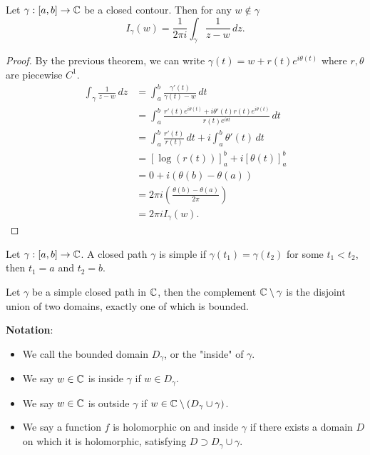 \documentclass[10pt, a4paper]{article}
\begin{document}
\begin{lemma}
    Let $\gamma : [a, b] \to \mathbb{C}$ be a closed contour.
    Then for any $w \notin \gamma$
    \[
    I_{\gamma}(w) = \frac{1}{2\pi i}\int_{\gamma}\frac{1}{z - w}\,dz.
    \]

    \begin{proof}
        By the previous theorem,
        we can write $\gamma(t) = w + r(t)e ^ {i\theta(t)}$ where $r, \theta$ are piecewise $C ^ 1$.
        \begin{align*}
            \int_{\gamma}\frac{1}{z - w}\,dz &= \int_{a}^{b}\frac{\gamma'(t)}{\gamma(t) - w}\,dt \\
            &= \int_{a}^{b}\frac{r'(t)e ^ {i\theta(t)} + i\theta'(t)r(t)e ^ {i\theta(t)}}{r(t)e ^ {i\theta t}}\,dt \\
            &= \int_{a}^{b}\frac{r'(t)}{r(t)}\,dt + i\int_{a}^{b}\theta'(t)\,dt \\
            &= \left[\log(r(t))\right]_{a}^{b} + i\left[\theta(t)\right]_{a}^{b} \\
            &= 0 + i(\theta(b) - \theta(a)) \\
            &= 2\pi i\left(\frac{\theta(b) - \theta(a)}{2\pi}\right) \\
            &= 2\pi iI_{\gamma}(w).
        \end{align*}
    \end{proof}
\end{lemma}

\begin{definition}
    Let $\gamma : [a, b] \to \mathbb{C}$.
    A closed path $\gamma$ is simple if $\gamma(t_1) = \gamma(t_2)$ for some $t_1 < t_2$,
    then $t_1 = a$ and $t_2 = b$.
\end{definition}

\begin{theorem}
    Let $\gamma$ be a simple closed path in $\mathbb{C}$,
    then the complement $\mathbb{C} \setminus \gamma$ is the disjoint union of two domains,
    exactly one of which is bounded.
\end{theorem}

\textbf{Notation}:
\begin{itemize}
    \item  We call the bounded domain $D_{\gamma}$,
    or the "inside" of $\gamma$.
    
    \item We say $w \in \mathbb{C}$ is inside $\gamma$ if $w \in D_{\gamma}$.
    
    \item We say $w \in \mathbb{C}$ is outside $\gamma$ if $w \in \mathbb{C} \setminus (D_{\gamma} \cup \gamma)$.
    
    \item We say a function $f$ is holomorphic on and inside $\gamma$ if there exists a domain $D$ on which it is holomorphic,
    satisfying $D \supset D_{\gamma} \cup \gamma$.
\end{itemize}
\end{document}
